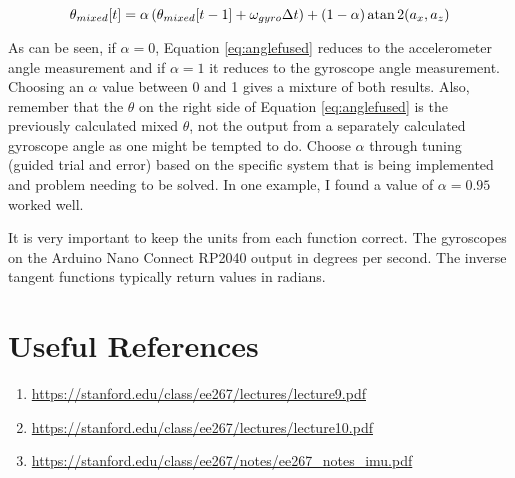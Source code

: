 \begin{equation}
	\label{eq:anglefused}
	\theta_{mixed}[t] = \alpha \left(\theta_{mixed}[t-1] + \omega_{gyro}\Delta t \right) + (1-\alpha)\atan2(a_x,a_z)
\end{equation}

As can be seen, if $\alpha=0$, Equation \ref{eq:anglefused} reduces to the accelerometer angle measurement 
and if $\alpha=1$ it reduces to the gyroscope angle measurement. Choosing an $\alpha$ value between 0 and 1 gives a 
mixture of both results. Also, remember that the $\theta$ on the right side of Equation \ref{eq:anglefused} 
is the previously calculated mixed $\theta$, not the output from a separately calculated gyroscope angle as 
one might be tempted to do. Choose $\alpha$ through tuning (guided trial and error) based on the specific 
system that is being implemented and problem needing to be solved. In one example, I found a value of $\alpha=0.95$ 
worked well.

It is very important to keep the units from each function correct. The gyroscopes on the Arduino Nano Connect RP2040
output in degrees per second. The inverse tangent functions typically return values in radians.


\section{Useful References}
\begin{enumerate}
	\item \href{https://stanford.edu/class/ee267/lectures/lecture9.pdf}{https://stanford.edu/class/ee267/lectures/lecture9.pdf}
	\item \href{https://stanford.edu/class/ee267/lectures/lecture10.pdf}{https://stanford.edu/class/ee267/lectures/lecture10.pdf}
	\item \href{https://stanford.edu/class/ee267/notes/ee267\_notes\_imu.pdf}{https://stanford.edu/class/ee267/notes/ee267\_notes\_imu.pdf}
\end{enumerate}